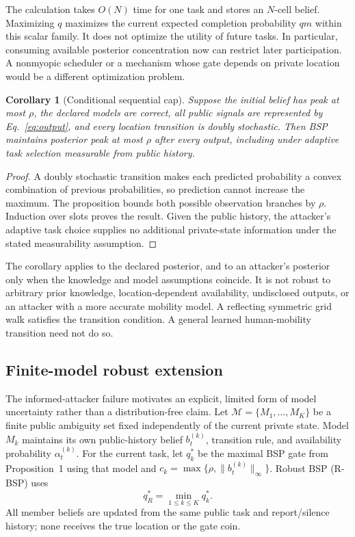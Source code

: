 \documentclass[review,12pt]{elsarticle}
\newtheorem{corollary}{Corollary}
\begin{document}
The calculation takes $O(N)$ time for one task and stores an $N$-cell belief. Maximizing $q$ maximizes the current expected completion probability $qm$ within this scalar family. It does not optimize the utility of future tasks. In particular, consuming available posterior concentration now can restrict later participation. A nonmyopic scheduler or a mechanism whose gate depends on private location would be a different optimization problem.

\begin{corollary}[Conditional sequential cap]
Suppose the initial belief has peak at most $\rho$, the declared models are correct, all public signals are represented by Eq.~\eqref{eq:output}, and every location transition is doubly stochastic. Then BSP maintains posterior peak at most $\rho$ after every output, including under adaptive task selection measurable from public history.
\end{corollary}
\begin{proof}
A doubly stochastic transition makes each predicted probability a convex combination of previous probabilities, so prediction cannot increase the maximum. The proposition bounds both possible observation branches by $\rho$. Induction over slots proves the result. Given the public history, the attacker's adaptive task choice supplies no additional private-state information under the stated measurability assumption.
\end{proof}

The corollary applies to the declared posterior, and to an attacker's posterior only when the knowledge and model assumptions coincide. It is not robust to arbitrary prior knowledge, location-dependent availability, undisclosed outputs, or an attacker with a more accurate mobility model. A reflecting symmetric grid walk satisfies the transition condition. A general learned human-mobility transition need not do so.

\subsection{Finite-model robust extension}
\label{sec:robust}
The informed-attacker failure motivates an explicit, limited form of model uncertainty rather than a distribution-free claim. Let $\mathcal M=\{M_1,\ldots,M_K\}$ be a finite public ambiguity set fixed independently of the current private state. Model $M_k$ maintains its own public-history belief $b_t^{(k)}$, transition rule, and availability probability $\alpha_t^{(k)}$. For the current task, let $q_k^*$ be the maximal BSP gate from Proposition~1 using that model and $c_k=\max\{\rho,\|b_t^{(k)}\|_\infty\}$. Robust BSP (R-BSP) uses
\begin{equation}
 q_R^*=\min_{1\le k\le K} q_k^*.
 \label{eq:robust-gate}
\end{equation}
All member beliefs are updated from the same public task and report/silence history; none receives the true location or the gate coin.
\end{document}
